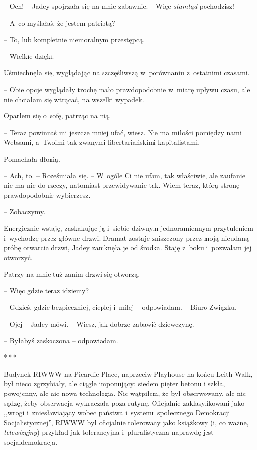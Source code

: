 \documentclass[oneside,polish,12pt,sfheadings]{mwbk}
\newcommand{\threeast}{\bigskip\par\centerline{*\,*\,*}\medskip\par}%
\begin{document}
-- Och! -- Jadey spojrzała się na mnie zabawnie. -- Więc \emph{stamtąd}
pochodzisz!

-- A~co myślałaś, że jestem patriotą?

-- To, lub kompletnie niemoralnym przestępcą.

-- Wielkie dzięki.

Uśmiechnęła się, wyglądając na szczęśliwszą w~porównaniu z~ostatnimi
czasami. 

-- Obie opcje wyglądały trochę mało prawdopodobnie w~miarę
upływu czasu, ale nie chciałam się wtrącać, na wszelki wypadek.

Oparłem się o~sofę, patrząc na nią. 

-- Teraz powinnaś mi jeszcze mniej
ufać, wiesz. Nie ma miłości pomiędzy nami Websami, a~Twoimi tak zwanymi
libertariańskimi kapitalistami.

Pomachała dłonią. 

-- Ach, to. -- Roześmiała się. -- W~ogóle Ci nie ufam,
tak właściwie, ale zaufanie nie ma nic do rzeczy, natomiast
przewidywanie tak. Wiem teraz, którą stronę prawdopodobnie wybierzesz.

-- Zobaczymy.

Energicznie wstaję, zaskakując ją i~siebie dziwnym jednoramiennym
przytuleniem i~wychodzę przez główne drzwi. Dramat zostaje zniszczony
przez moją nieudaną próbę otwarcia drzwi, Jadey zamknęła je od środka.
Staję z~boku i~pozwalam jej otworzyć.

Patrzy na mnie tuż zanim drzwi się otworzą.

-- Więc gdzie teraz idziemy?

-- Gdzieś, gdzie bezpieczniej, cieplej i~milej -- odpowiadam. -- Biuro
Związku.

-- Ojej -- Jadey mówi. -- Wiesz, jak dobrze zabawić dziewczynę.

-- Byłabyś zaskoczona -- odpowiadam.

\threeast

Budynek RIWWW na Picardie Place, naprzeciw Playhouse na końcu Leith
Walk, był nieco zgrzybiały, ale ciągle imponujący: siedem pięter betonu
i szkła, powojenny, ale nie nowa technologia. Nie wątpiłem, że był
obserwowany, ale nie sądzę, żeby obserwacja wykraczała poza rutynę.
Oficjalnie zaklasyfikowani jako ,,wrogi i~zniesławiający wobec państwa i~systemu społecznego Demokracji Socjalistycznej'', RIWWW był oficjalnie
tolerowany jako książkowy (i, co ważne, \emph{telewizyjny}) przykład jak
tolerancyjna i~pluralistyczna naprawdę jest socjaldemokracja.
\end{document}
